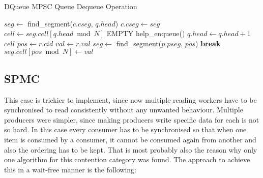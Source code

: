 \begin{algorithm}[!ht]
    \centering
    \captionsetup{justification=centering}
    \caption{DQueue \ac{MPSC} Queue Dequeue Operation \cite{WangCacheCoherent}}
    \label{alg:dqueue-dequeue}
    \scriptsize
    \begin{algorithmic}[1]
            \State $seg \gets$ find\_segment($c.cseg$, $q.head$)
                \State $c.cseg \gets seg$ 
            \EndIf
            \State $cell \gets seg.cell[q.head \bmod N]$
             
                    \State \Return EMPTY
                \Else
                    \State help\_enqueue() 
                \EndIf
            \EndIf
            \State $q.head \gets q.head + 1$ 
            \State \Return $cell$
        \EndFunction
        \State
                    \State $pos \gets r.cid$
                    \State $val \gets r.val$
                    \State $seg \gets$ find\_segment($p.pseg$, $pos$)
                        \State \textbf{break} 
                    \EndIf
                        \State $seg.cell[pos \bmod N] \gets val$ 
                    \EndIf
                \EndFor
            \EndFor
        \EndFunction
    \end{algorithmic}
\end{algorithm}

\subsection{\acf{SPMC}}\label{subsec:single-producer-and-multiple-consumer}
This case is trickier to implement, since now multiple reading workers have to be synchronised to read consistently without any unwanted behaviour. Multiple producers were simpler, since making producers write specific data for each is not so hard. In this case every consumer has to be synchronised so that when one item is consumed by a consumer, it cannot be consumed again from another and also the ordering has to be kept. That is most probably also the reason why only one algorithm for this contention category was found. The approach to achieve this in a wait-free manner is the following:

